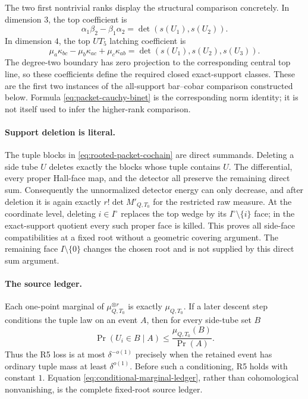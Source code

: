 \documentclass[11pt]{article}
\begin{document}
The two first nontrivial ranks display the structural comparison concretely.
In dimension \(3\), the top coefficient is
\[
 \alpha_1\beta_2-\beta_1\alpha_2
 =\det(s(U_1),s(U_2)).
\]
In dimension \(4\), the top \(UT_5\) latching coefficient is
\[
 \mu_a\kappa_{bc}-\mu_b\kappa_{ac}+\mu_c\kappa_{ab}
 =\det(s(U_1),s(U_2),s(U_3)).
\]
The degree-two boundary has zero projection to the corresponding central top
line, so these coefficients define the required closed exact-support classes.
These are the first two instances of the all-support bar--cobar comparison
constructed below.  Formula \eqref{eq:packet-cauchy-binet} is the corresponding
norm identity; it is not itself used to infer the higher-rank comparison.

\paragraph{Support deletion is literal.}
The tuple blocks in \eqref{eq:rooted-packet-cochain} are direct summands.
Deleting a side tube \(U\) deletes exactly the blocks whose tuple contains
\(U\).  The differential, every proper Hall-face map, and the detector all
preserve the remaining direct sum.  Consequently the unnormalized detector
energy can only decrease, and after deletion it is again exactly
\(r!\det M'_{Q,T_0}\) for the restricted raw measure.  At the coordinate level,
deleting \(i\in I^\circ\) replaces the top wedge by its
\(I^\circ\setminus\{i\}\) face; in the exact-support quotient every such proper
face is killed.  This proves all side-face compatibilities at a fixed root
without a geometric covering argument.  The remaining face
\(I\setminus\{0\}\) changes the chosen root and is not supplied by this direct
sum argument.

\paragraph{The source ledger.}
Each one-point marginal of
\(\mu_{Q,T_0}^{\otimes r}\) is exactly \(\mu_{Q,T_0}\).  If a later descent step
conditions the tuple law on an event \(A\), then for every side-tube set \(B\)
\begin{equation}\label{eq:conditional-marginal-ledger}
 \Pr(U_i\in B\mid A)
 \le \frac{\mu_{Q,T_0}(B)}{\Pr(A)}.
\end{equation}
Thus the R5 loss is at most \(\delta^{-o(1)}\) precisely when the retained event
has ordinary tuple mass at least \(\delta^{o(1)}\).  Before such a conditioning,
R5 holds with constant \(1\).  Equation
\eqref{eq:conditional-marginal-ledger}, rather than cohomological nonvanishing,
is the complete fixed-root source ledger.
\end{document}
